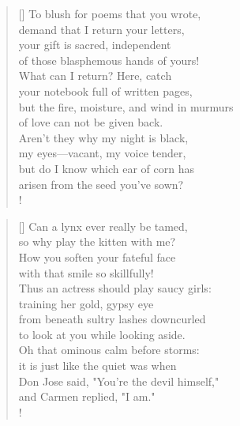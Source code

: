 \documentclass[]{article}
\begin{document}
\settowidth{\versewidth}{To blush for poems that you wrote,  }
\begin{verse}[\versewidth]
To blush for poems that you wrote,\\
demand that I return your letters,\\
your gift is sacred, independent\\
of those blasphemous hands of yours!\\
What can I return? Here, catch\\
your notebook full of written pages,\\
but the fire, moisture, and wind in murmurs\\
of love can not be given back.\\
Aren't they why my night is black,\\
my eyes—vacant, my voice tender,\\
but do I know which ear of corn has\\
arisen from the seed you've sown?\\!
\end{verse}
\newpage 

\settowidth{\versewidth}{Can a lynx ever really be tamed,  }
\begin{verse}[\versewidth]
Can a lynx ever really be tamed,\\
so why play the kitten with me?\\
How you soften your fateful face\\
with that smile so skillfully!\\
Thus an actress should play saucy girls:\\
training her gold, gypsy eye\\
from beneath sultry lashes downcurled\\
to look at you while looking aside.\\
Oh that ominous calm before storms:\\
it is just like the quiet was when\\
Don Jose said, "You're the devil himself,"\\
and Carmen replied, "I am."\\!
\end{verse}
\bigskip \bigskip
\end{document}
